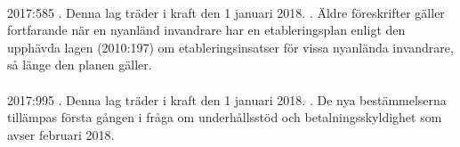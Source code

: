 \documentclass[a4paper,notitlepage,openany,10pt]{book}
\begin{document}
\paragraph*{}
2017:585
. Denna lag träder i kraft den 1 januari 2018.
. Äldre föreskrifter gäller fortfarande när en nyanländ invandrare har en etableringsplan enligt den upphävda lagen (2010:197) om etableringsinsatser för vissa nyanlända invandrare, så länge den planen gäller.
\paragraph*{}
2017:995
. Denna lag träder i kraft den 1 januari 2018.
. De nya bestämmelserna tillämpas första gången i fråga om underhållsstöd och betalningsskyldighet som avser februari 2018.
\end{document}

